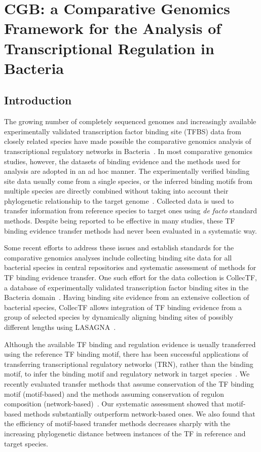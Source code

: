 \chapter{CGB: a Comparative Genomics Framework for the Analysis of
  Transcriptional Regulation in Bacteria}
\section{Introduction}

The growing number of completely sequenced genomes and increasingly available
experimentally validated transcription factor binding site (TFBS) data from
closely related species have made possible the comparative genomics analysis of
transcriptional regulatory networks in Bacteria~\citep{makarova2001conservation,
  rodionov2007comparative, babu2004structure}. In most comparative genomics
studies, however, the datasets of binding evidence and the methods used for
analysis are adopted in an ad hoc manner. The experimentally verified binding
site data usually come from a single species, or the inferred binding motifs
from multiple species are directly combined without taking into account their
phylogenetic relationship to the target genome~\citep{erill2004differences,
  novichkov2010regpredict, ravcheev2013genomic, leyn2014comparative,
  kazakov2009comparative, rodionov2008transcriptional}. Collected data is used
to transfer information from reference species to target ones using \textit{de
  facto} standard methods. Despite being reported to be effective in many
studies, these TF binding evidence transfer methods had never been evaluated in
a systematic way.

Some recent efforts to address these issues and establish standards for the
comparative genomics analyses include collecting binding site data for all
bacterial species in central repositories and systematic assessment of methods
for TF binding evidence transfer. One such effort for the data collection is
CollecTF, a database of experimentally validated transcription factor binding
sites in the Bacteria domain~\citep{kilic2013collectf}. Having binding site
evidence from an extensive collection of bacterial species, CollecTF allows
integration of TF binding evidence from a group of selected species by
dynamically aligning binding sites of possibly different lengths using
LASAGNA~\citep{lee2013lasagna}.

Although the available TF binding and regulation evidence is usually
transferred using the reference TF binding motif, there has been successful
applications of transferring transcriptional regulatory networks (TRN), rather
than the binding motif, to infer the binding motif and regulatory network in
target species~\citep{babu2008computational, novichkov2010regpredict}. We
recently evaluated transfer methods that assume conservation of the TF binding
motif (motif-based) and the methods assuming conservation of regulon
composition (network-based)~\citep{kilic2015assessment}. Our systematic
assessment showed that motif-based methods substantially outperform
network-based ones. We also found that the efficiency of motif-based transfer
methods decreases sharply with the increasing phylogenetic distance between
instances of the TF in reference and target species.

